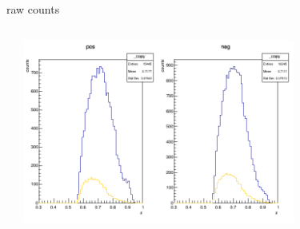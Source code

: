 \begin{frame}{raw counts}
\begin{columns}
\begin{column}[T]{0.5\textwidth}
\end{column}
\begin{column}[T]{0.5\textwidth}
\includegraphics[width = 0.7\textwidth]{results/yield/statistics/counts_x_Q2_z_0.50_3.979_0.70.png}
\end{column}
\end{columns}
\end{frame}
